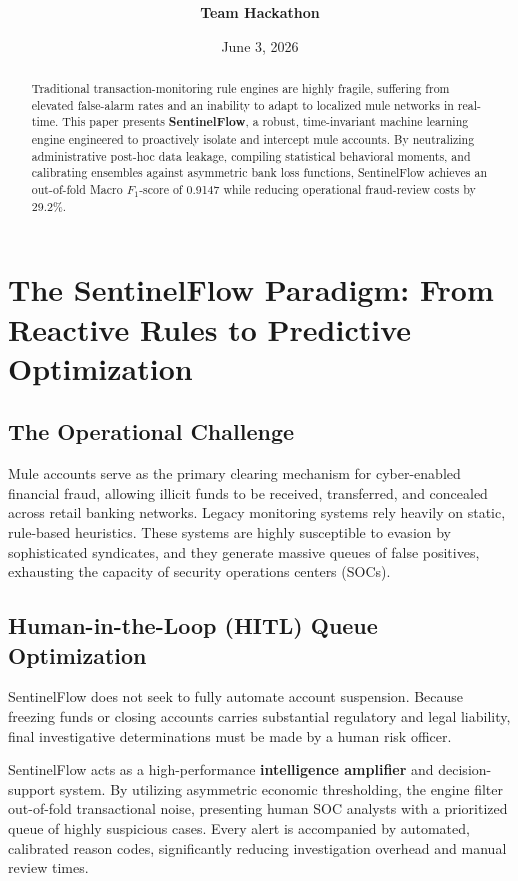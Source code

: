 \documentclass[11pt,a4paper]{article}
\title{\textbf{\color{navy}{SentinelFlow: A Time-Invariant, Cost-Optimized Machine Learning System for Real-Time Mule Account Intervention}}}
\author{\textbf{Team Hackathon}}
\date{June 3, 2026}
\begin{document}
\maketitle
\begin{abstract}
Traditional transaction-monitoring rule engines are highly fragile, suffering from elevated false-alarm rates and an inability to adapt to localized mule networks in real-time. This paper presents \textbf{SentinelFlow}, a robust, time-invariant machine learning engine engineered to proactively isolate and intercept mule accounts. By neutralizing administrative post-hoc data leakage, compiling statistical behavioral moments, and calibrating ensembles against asymmetric bank loss functions, SentinelFlow achieves an out-of-fold Macro $F_1$-score of 0.9147 while reducing operational fraud-review costs by 29.2\%.\end{abstract}

\tableofcontents
\newpage

\section{The SentinelFlow Paradigm: From Reactive Rules to Predictive Optimization}
\subsection*{The Operational Challenge}
Mule accounts serve as the primary clearing mechanism for cyber-enabled financial fraud, allowing illicit funds to be received, transferred, and concealed across retail banking networks. Legacy monitoring systems rely heavily on static, rule-based heuristics. These systems are highly susceptible to evasion by sophisticated syndicates, and they generate massive queues of false positives, exhausting the capacity of security operations centers (SOCs).

\subsection*{Human-in-the-Loop (HITL) Queue Optimization}
SentinelFlow does not seek to fully automate account suspension. Because freezing funds or closing accounts carries substantial regulatory and legal liability, final investigative determinations must be made by a human risk officer. 

SentinelFlow acts as a high-performance \textbf{intelligence amplifier} and decision-support system. By utilizing asymmetric economic thresholding, the engine filter out-of-fold transactional noise, presenting human SOC analysts with a prioritized queue of highly suspicious cases. Every alert is accompanied by automated, calibrated reason codes, significantly reducing investigation overhead and manual review times.
\end{document}
